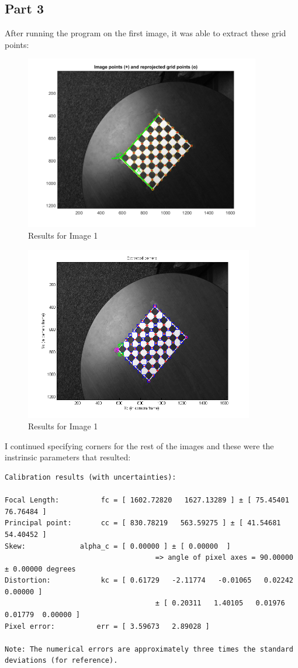 \documentclass[11pt,psfig]{article}
\begin{document}
\subsection*{Part 3}

After running the program on the first image, it was able to extract these grid points:
\begin{figure}[H]
\centering
\includegraphics[height=3in]{prob3plot1.png}
\caption{Results for Image 1}
\end{figure}
\begin{figure}[H]
\centering
\includegraphics[height=3in]{prob3plot2.png}
\caption{Results for Image 1}
\end{figure}
\newpage
I continued specifying corners for the rest of the images and these were the instrinsic parameters that resulted:
\begin{verbatim}
Calibration results (with uncertainties):

Focal Length:          fc = [ 1602.72820   1627.13289 ] ± [ 75.45401   76.76484 ]
Principal point:       cc = [ 830.78219   563.59275 ] ± [ 41.54681   54.40452 ]
Skew:             alpha_c = [ 0.00000 ] ± [ 0.00000  ]   
									=> angle of pixel axes = 90.00000 ± 0.00000 degrees
Distortion:            kc = [ 0.61729   -2.11774   -0.01065   0.02242  0.00000 ] 
									± [ 0.20311   1.40105   0.01976   0.01779  0.00000 ]
Pixel error:          err = [ 3.59673   2.89028 ]

Note: The numerical errors are approximately three times the standard deviations (for reference).

\end{verbatim}
\end{document}
